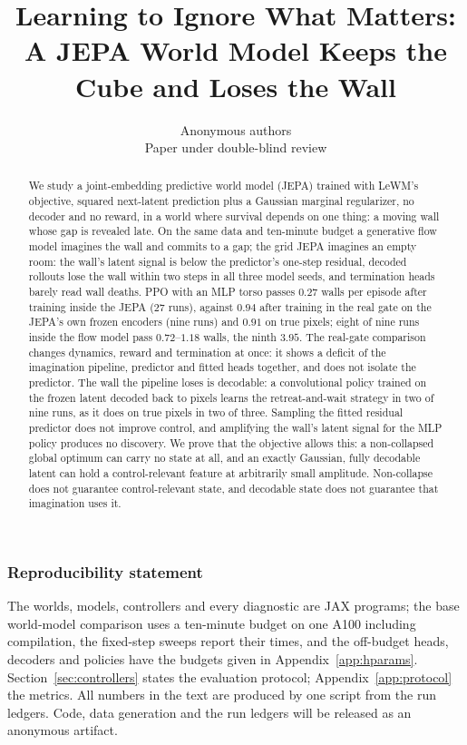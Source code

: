 \documentclass{article}
\title{Learning to Ignore What Matters:\\ A JEPA World Model Keeps the Cube and Loses the Wall}
\author{Anonymous authors\\Paper under double-blind review}
\theoremstyle{remark}
\begin{document}
\maketitle


\begin{abstract}
We study a joint-embedding predictive world model (JEPA) trained with LeWM's objective, squared
next-latent prediction plus a Gaussian marginal regularizer, no decoder and no reward, in a world where
survival depends on one thing: a moving wall whose gap is revealed late. On the same data and ten-minute
budget a generative flow model imagines the wall and commits to a gap; the grid JEPA imagines an empty
room: the wall's latent signal is below the predictor's one-step residual, decoded rollouts lose the wall
within two steps in all three model seeds, and termination heads barely read wall deaths. PPO with an
MLP torso passes $0.27$ walls per episode after training inside the JEPA ($27$ runs), against $0.94$
after training in the real gate on the JEPA's own frozen encoders (nine runs) and $0.91$ on true pixels;
eight of nine runs inside the flow model pass $0.72$--$1.18$ walls, the ninth $3.95$. The real-gate
comparison changes dynamics, reward and termination at once: it shows a deficit of the imagination
pipeline, predictor and fitted heads together, and does not isolate the predictor. The wall the pipeline
loses is decodable: a convolutional policy trained on the frozen latent decoded back to pixels learns the
retreat-and-wait strategy in two of nine runs, as it does on true pixels in two of three. Sampling the
fitted residual predictor does not improve control, and amplifying the wall's latent signal for the MLP
policy produces no discovery. We prove that the objective allows this: a non-collapsed global optimum
can carry no state at all, and an exactly Gaussian, fully decodable latent can hold a control-relevant
feature at arbitrarily small amplitude. Non-collapse does not guarantee control-relevant state, and
decodable state does not guarantee that imagination uses it.
\end{abstract}









\subsubsection*{Reproducibility statement}
The worlds, models, controllers and every diagnostic are JAX programs; the base world-model comparison uses a ten-minute budget on one A100 including compilation, the fixed-step sweeps report their times, and the off-budget heads, decoders and policies have the budgets given in Appendix~\ref{app:hparams}. Section~\ref{sec:controllers} states the evaluation protocol; Appendix~\ref{app:protocol}
the metrics. All numbers in the text are produced by one script from the run ledgers. Code, data generation and
the run ledgers will be released as an anonymous artifact.
\end{document}
